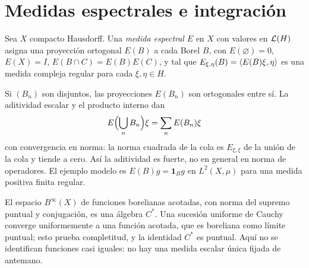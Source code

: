 \section{Medidas espectrales e integración}\label{lec:v3-34}

\begin{definicion}
Sea $X$ compacto Hausdorff. Una \emph{medida espectral} $E$ en $X$ con valores en $\mathcal L(H)$ asigna una proyección ortogonal $E(B)$ a cada Borel $B$, con $E(\varnothing)=0$, $E(X)=I$, $E(B\cap C)=E(B)E(C)$, y tal que
$E_{\xi,\eta}(B)=\left\langle E(B)\xi,\eta\right\rangle$ es una medida compleja regular para cada $\xi,\eta\in H$.
\end{definicion}

Si $(B_n)$ son disjuntos, las proyecciones $E(B_n)$ son ortogonales entre sí. La aditividad escalar y el producto interno dan
\[
 E\Bigl(\bigcup_nB_n\Bigr)\xi=\sum_nE(B_n)\xi
\]
con convergencia en norma: la norma cuadrada de la cola es $E_{\xi,\xi}$ de la unión de la cola y tiende a cero. Así la aditividad es fuerte, no en general en norma de operadores. El ejemplo modelo es $E(B)g=\mathbf1_Bg$ en $L^2(X,\mu)$ para una medida positiva finita regular.

El espacio $B^\infty(X)$ de funciones borelianas acotadas, con norma del supremo puntual y conjugación, es una álgebra $C^*$. Una sucesión uniforme de Cauchy converge uniformemente a una función acotada, que es boreliana como límite puntual; esto prueba completitud, y la identidad $C^*$ es puntual. Aquí no se identifican funciones casi iguales: no hay una medida escalar única fijada de antemano.

